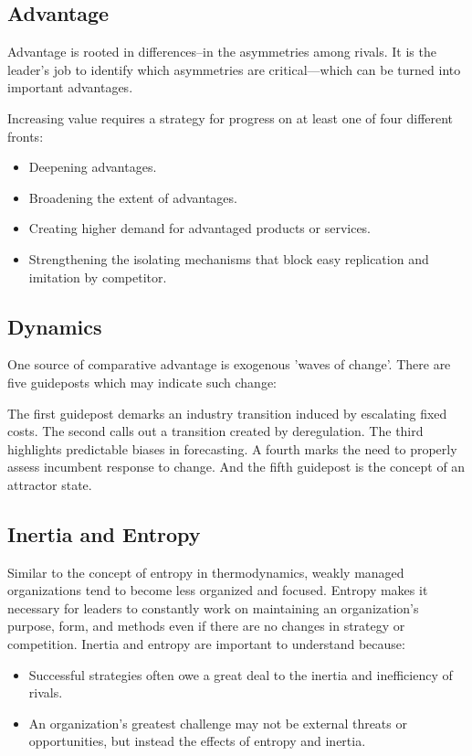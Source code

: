\documentclass{article}
\newenvironment{nosepitemize}
{ \begin{itemize}
    \setlength{\itemsep}{0pt}
    \setlength{\parskip}{0pt}
    \setlength{\parsep}{0pt}     }
{ \end{itemize}                  }
\begin{document}
\begin{multicols}{2}
\subsection{Advantage}
Advantage is rooted in differences–in the asymmetries among rivals. It is the leader’s job to identify which asymmetries are critical—which can be turned into important advantages.

Increasing value requires a strategy for progress on at least one of four different fronts:

\begin{nosepitemize}
    \item Deepening advantages.
    \item Broadening the extent of advantages.
    \item Creating higher demand for advantaged products or services.
    \item Strengthening the isolating mechanisms that block easy replication and imitation by competitor.
\end{nosepitemize}


\subsection{Dynamics}

One source of comparative advantage is exogenous 'waves of change'. There are five guideposts which may indicate such change:

The first guidepost demarks an industry transition induced by escalating fixed costs. The second calls out a transition created by deregulation. The third highlights predictable biases in forecasting. A fourth marks the need to properly assess incumbent response to change. And the fifth guidepost is the concept of an attractor state.

\subsection{Inertia and Entropy}

Similar to the concept of entropy in thermodynamics, weakly managed organizations tend to become less organized and focused. Entropy makes it necessary for leaders to constantly work on maintaining an organization’s purpose, form, and methods even if there are no changes in strategy or competition. Inertia and entropy are important to understand because:

\begin{nosepitemize}
    \item Successful strategies often owe a great deal to the inertia and inefficiency of rivals.
    \item An organization’s greatest challenge may not be external threats or opportunities, but instead the effects of entropy and inertia.
\end{nosepitemize}


\end{multicols}
\end{document}
